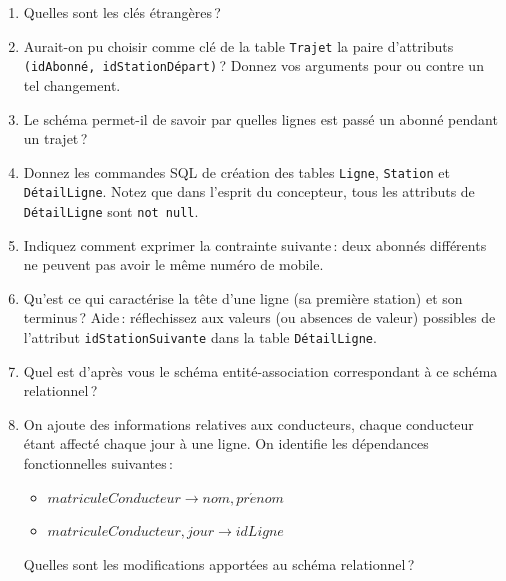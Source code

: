 \begin{enumerate}
   \item Quelles sont les clés étrangères\,?

 \item Aurait-on pu choisir comme clé de la table \texttt{Trajet}
      la paire d'attributs \texttt{(idAbonné, idStationDépart)}\,? Donnez vos arguments pour ou contre
      un tel changement.
       
  \item Le schéma permet-il de savoir par quelles lignes est passé un abonné pendant un trajet\,?
  
 \item Donnez les commandes SQL de création des tables \texttt{Ligne}, \texttt{Station}
 et \texttt{DétailLigne}. Notez que dans l'esprit du concepteur, 
 tous les attributs de \texttt{DétailLigne} 
 sont  \texttt{not null}.
  
  \item Indiquez comment exprimer la contrainte suivante\,:
         deux abonnés différents ne peuvent pas avoir le même
             numéro de mobile.
            
  \item Qu'est ce qui caractérise la tête d'une ligne (sa première station) et son terminus\,? 
      Aide\,: réflechissez aux valeurs (ou absences de valeur) possibles de l'attribut \texttt{idStationSuivante}
      dans la table \texttt{DétailLigne}.
 
  \item Quel est d'après vous le schéma entité-association 
        correspondant à ce schéma relationnel\,?
        
   \item On ajoute des informations relatives aux conducteurs, chaque conducteur étant 
      affecté chaque jour à une ligne. On identifie les dépendances fonctionnelles suivantes\,:
      \begin{itemize}
        \item $matriculeConducteur \to nom, pr\acute{e}nom$
        \item $matriculeConducteur, jour \to idLigne$
      \end{itemize}
      Quelles sont les modifications apportées au schéma relationnel\,?

\end{enumerate}

